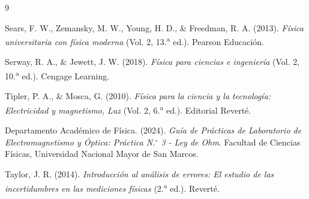 \documentclass[12pt,a4paper]{article}
\begin{document}
\newpage

\renewcommand{\refname}{BIBLIOGRAFÍA}
\begin{thebibliography}{9}

Sears, F. W., Zemansky, M. W., Young, H. D., \& Freedman, R. A. (2013). 
\textit{Física universitaria con física moderna} (Vol. 2, 13.\textsuperscript{a} ed.). Pearson Educación.

Serway, R. A., \& Jewett, J. W. (2018). 
\textit{Física para ciencias e ingeniería} (Vol. 2, 10.\textsuperscript{a} ed.). Cengage Learning.

Tipler, P. A., \& Mosca, G. (2010). 
\textit{Física para la ciencia y la tecnología: Electricidad y magnetismo, Luz} (Vol. 2, 6.\textsuperscript{a} ed.). Editorial Reverté.

Departamento Académico de Física. (2024). 
\textit{Guía de Prácticas de Laboratorio de Electromagnetismo y Óptica: Práctica N.$^\circ$ 3 - Ley de Ohm}. Facultad de Ciencias Físicas, Universidad Nacional Mayor de San Marcos.

Taylor, J. R. (2014). 
\textit{Introducción al análisis de errores: El estudio de las incertidumbres en las mediciones físicas} (2.\textsuperscript{a} ed.). Reverté.

\end{thebibliography}
\end{document}
